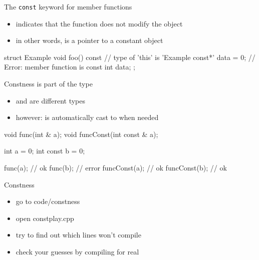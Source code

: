 \begin{frame}[fragile]
  \begin{block}{The \texttt{const} keyword for member functions}
    \begin{itemize}
    \item indicates that the function does not modify the object
    \item in other words,  is a pointer to a constant object
    \end{itemize}
  \end{block}
  \begin{cppcode}
    struct Example {
      void foo() const {
        // type of 'this' is 'Example const*'
        data = 0; // Error: member function is const
      }
      int data;
    };
  \end{cppcode}
\end{frame}

\begin{frame}[fragile]
  \begin{block}{Constness is part of the type}
    \begin{itemize}
    \item {} and  are different types
    \item however:  is automatically cast to  when needed
    \end{itemize}
  \end{block}
  \begin{cppcode}
    void func(int & a);
    void funcConst(int const & a);

    int a = 0;
    int const b = 0;

    func(a);      // ok
    func(b);      // error
    funcConst(a); // ok
    funcConst(b); // ok
  \end{cppcode}
\end{frame}

\begin{frame}[fragile]
  \begin{exercise}{Constness}
    \begin{itemize}
    \item go to code/constness
    \item open constplay.cpp
    \item try to find out which lines won't compile
    \item check your guesses by compiling for real
    \end{itemize}
  \end{exercise}
\end{frame}
